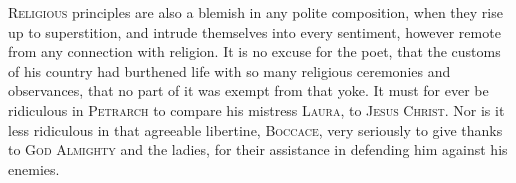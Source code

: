 \textsc{Religious} principles are also a blemish in any polite
composition, when they rise up to superstition, and intrude themselves
into every sentiment, however remote from any connection with
religion. It is no excuse for the poet, that the customs of his
country had burthened life with so many religious ceremonies and
observances, that no part of it was exempt from that yoke. It must for
ever be ridiculous in \textsc{Petrarch} to compare his mistress
\textsc{Laura}, to \textsc{Jesus Christ}. Nor is it less ridiculous in
that agreeable libertine, \textsc{Boccace}, very seriously to give
thanks to \textsc{God Almighty} and the ladies, for their assistance
in defending him against his enemies.

